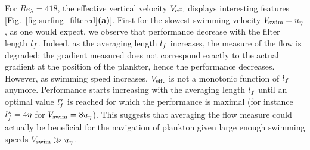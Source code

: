 For $\mathit{Re}_{\lambda} = 418$, the effective vertical velocity $V_{\mathrm{eff.}}$ displays interesting features [Fig.~\ref{fig:surfing_filtered}\textbf{(a)}].
First for the slowest swimming velocity $V_{\mathrm{swim}} = u_{\eta}$, as one would expect, we observe that performance decrease with the filter length $l_{f}$.
Indeed, as the averaging length $l_{f}$ increases, the measure of the flow is degraded: the gradient measured does not correspond exactly to the actual gradient at the position of the plankter, hence the performance decreases.
However, as swimming speed increases, $V_{\mathrm{eff.}}$ is not a monotonic function of $l_{f}$ anymore.
Performance starts increasing with the averaging length $l_{f}$ until an optimal value $l_{f}^*$ is reached for which the performance is maximal (for instance $l_{f}^* = 4 \eta$ for $V_{\mathrm{swim}} = 8 u_{\eta}$).
This suggests that averaging the flow measure could actually be beneficial for the navigation of plankton given large enough swimming speeds $V_{\mathrm{swim}} \gg u_{\eta}$.

